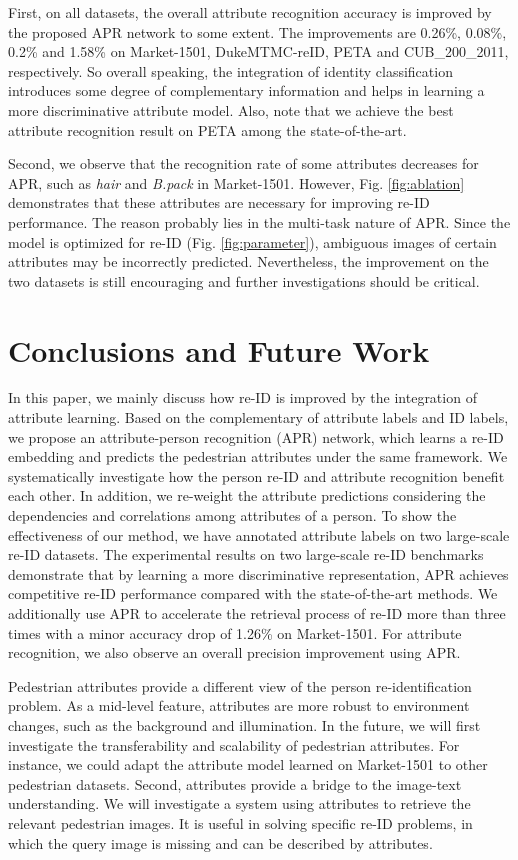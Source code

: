 \documentclass[5p,times,twocolumn]{elsarticle}
\begin{document}
    
    
First, on all datasets, the overall attribute recognition accuracy is improved by the proposed APR network to some extent. The improvements are 0.26\%, 0.08\%, 0.2\% and 1.58\% on Market-1501, DukeMTMC-reID, PETA and CUB\_200\_2011, respectively. So overall speaking, the integration of identity classification introduces some degree of complementary information and helps in learning a more discriminative attribute model. Also, note that we achieve the best attribute recognition result on PETA among the state-of-the-art.
    
Second, we observe that the recognition rate of some attributes decreases for APR, such as \emph{hair} and \emph{B.pack} in Market-1501. However, Fig. \ref{fig:ablation} demonstrates that these attributes are necessary for improving re-ID performance. The reason probably lies in the multi-task nature of APR. Since the model is optimized for re-ID (Fig. \ref{fig:parameter}), ambiguous images of certain attributes may be incorrectly predicted. Nevertheless, the improvement on the two datasets is still encouraging and further investigations should be critical.
        
    

    
\section{Conclusions and Future Work}
In this paper, we mainly discuss how re-ID is improved by the integration of attribute learning.
Based on the complementary of attribute labels and ID labels, we propose an attribute-person recognition (APR) network, which learns a re-ID embedding and predicts the pedestrian attributes under the same framework.
We systematically investigate how the person re-ID and attribute recognition benefit each other. 
In addition, we re-weight the attribute predictions considering the dependencies and correlations among attributes of a person.
To show the effectiveness of our method, we have annotated attribute labels on two large-scale re-ID datasets. The experimental results on two large-scale re-ID benchmarks demonstrate that by learning a more discriminative representation, APR achieves competitive re-ID performance compared with the state-of-the-art methods. 
We additionally use APR to accelerate the retrieval process of re-ID more than three times with a minor accuracy drop of 1.26\% on Market-1501. For attribute recognition, we also observe an overall precision improvement using APR.

Pedestrian attributes provide a different view of the person re-identification problem. As a mid-level feature, attributes are more robust to environment changes, such as the background and illumination. In the future, we will first investigate the transferability and scalability of pedestrian attributes. For instance, we could adapt the attribute model learned on Market-1501 to other pedestrian datasets. Second, attributes provide a bridge to the image-text understanding. We will investigate a system using attributes to retrieve the relevant pedestrian images. It is useful in solving specific re-ID problems, in which the query image is missing and can be described by attributes.


\end{document}
